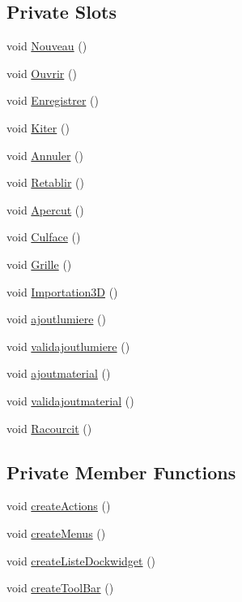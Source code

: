 \subsection*{Private Slots}
\begin{DoxyCompactItemize}
\item 
void \hyperlink{class_main_window_a6f837f331c40d27e47fbb0d6a73b040e}{Nouveau} ()
\item 
void \hyperlink{class_main_window_adbc60f34a13a49cc015dc4a124a588a1}{Ouvrir} ()
\item 
void \hyperlink{class_main_window_a8c07d91b87178ac0a1b88aabc45c6ddb}{Enregistrer} ()
\item 
void \hyperlink{class_main_window_a4558a3ff95a78f4a0e0d0adf312a6b8c}{Kiter} ()
\item 
void \hyperlink{class_main_window_a5277087cb1c0b01722b7a4ff436070ba}{Annuler} ()
\item 
void \hyperlink{class_main_window_ab2ff5da91852950471811fa93028dc0c}{Retablir} ()
\item 
void \hyperlink{class_main_window_a019328eaf07af3c9b8850e3db14fdf30}{Apercut} ()
\item 
void \hyperlink{class_main_window_a0b391dfd82e868b6f8badbc9717d6f49}{Culface} ()
\item 
void \hyperlink{class_main_window_a9a4d5849cf40a3ce50941e56cfa0be35}{Grille} ()
\item 
void \hyperlink{class_main_window_af26018b1d699cbf0a3f62048472cc489}{Importation3\+D} ()
\item 
void \hyperlink{class_main_window_a42d29fe9a2657a5c5563b3f1235a28e4}{ajoutlumiere} ()
\item 
void \hyperlink{class_main_window_a56f65a459f0caca9f71251663b200431}{validajoutlumiere} ()
\item 
void \hyperlink{class_main_window_a3a599353265f9c01a8780529aa5fed75}{ajoutmaterial} ()
\item 
void \hyperlink{class_main_window_a2d8cee622b78ccdeed758c51b9fb5b0e}{validajoutmaterial} ()
\item 
void \hyperlink{class_main_window_abd2acb261445354d2fd680c9b48bad77}{Racourcit} ()
\end{DoxyCompactItemize}
\subsection*{Private Member Functions}
\begin{DoxyCompactItemize}
\item 
void \hyperlink{class_main_window_a62cd8712fb41a754298f6f60eead2cb0}{create\+Actions} ()
\item 
void \hyperlink{class_main_window_aa4907b0251d305659e403c62921ef331}{create\+Menus} ()
\item 
void \hyperlink{class_main_window_a7b7fd06b9e7bfc83904b1d5b6503e9e9}{create\+Liste\+Dockwidget} ()
\item 
void \hyperlink{class_main_window_aeb57235ebc08860e680132db167c09b4}{create\+Tool\+Bar} ()
\end{DoxyCompactItemize}
